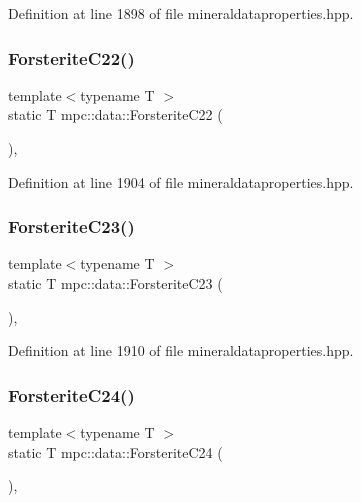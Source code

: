 Definition at line 1898 of file mineraldataproperties.\+hpp.

\mbox{\label{namespacempc_1_1data_a83a914039d4a81b37e854d76a95e9a1d}} 
\subsubsection{\texorpdfstring{Forsterite\+C22()}{ForsteriteC22()}}
{\footnotesize\ttfamily template$<$typename T $>$ \\
static T mpc\+::data\+::\+Forsterite\+C22 (\begin{DoxyParamCaption}{ }\end{DoxyParamCaption})\hspace{0.3cm}{\ttfamily [inline]}, {\ttfamily [static]}}



Definition at line 1904 of file mineraldataproperties.\+hpp.

\mbox{\label{namespacempc_1_1data_ab0f172914c41ce2226932800c7473186}} 
\subsubsection{\texorpdfstring{Forsterite\+C23()}{ForsteriteC23()}}
{\footnotesize\ttfamily template$<$typename T $>$ \\
static T mpc\+::data\+::\+Forsterite\+C23 (\begin{DoxyParamCaption}{ }\end{DoxyParamCaption})\hspace{0.3cm}{\ttfamily [inline]}, {\ttfamily [static]}}



Definition at line 1910 of file mineraldataproperties.\+hpp.

\mbox{\label{namespacempc_1_1data_a6dd48ff1b45434b2448dd987a7c6dc14}} 
\subsubsection{\texorpdfstring{Forsterite\+C24()}{ForsteriteC24()}}
{\footnotesize\ttfamily template$<$typename T $>$ \\
static T mpc\+::data\+::\+Forsterite\+C24 (\begin{DoxyParamCaption}{ }\end{DoxyParamCaption})\hspace{0.3cm}{\ttfamily [inline]}, {\ttfamily [static]}}



